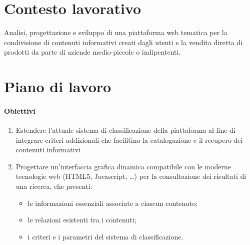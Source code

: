 \documentclass[10pt,a4paper,hidelinks]{scrartcl} %
\begin{document}
    \title{\rmfamily\normalfont{}}
    \author{}
    \date{\today}
    
    \maketitle
    
    \begin{abstract}
        \noindent Piano di lavoro settimanale per stage esterno presso \textsf{FondaMente}.
    \end{abstract}
       
    
    \section{Contesto lavorativo}
	Analisi, progettazione e sviluppo di una piattaforma web tematica per la condivisione di contenuti informativi creati dagli utenti e la vendita diretta di prodotti da parte di aziende medio-piccole o indipententi.

	\section{Piano di lavoro}

	\paragraph{Obiettivi}
	\begin{enumerate}
		\item Estendere l'attuale sistema di classificazione della piattaforma al fine di integrare criteri addizionali che facilitino la catalogazione e il recupero dei contenuti informativi
		\item Progettare un'interfaccia grafica dinamica compatibile con le moderne tecnologie web (HTML5, Javascript, \ldots) per la consultazione dei risultati di una ricerca, che presenti:
		\begin{itemize}
			\item le informazioni essenziali associate a ciascun contenuto;
			\item le relazioni esistenti tra i contenuti;
			\item i criteri e i parametri del sistema di classificazione.
		\end{itemize}
	\end{enumerate}
	
\end{document}
